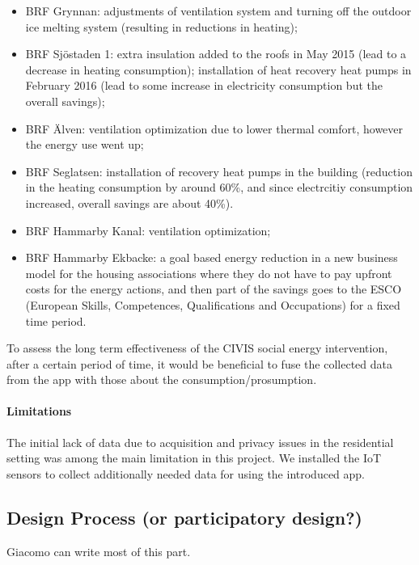 \begin{itemize}
	\setlength{\itemsep}{0mm}
	\item BRF	Grynnan: adjustments of	ventilation	system and	turning	off	the	outdoor	ice	melting	system (resulting in	reductions	in	heating);
	\item BRF	 Sj\"ostaden	 1: extra	 insulation	 added	 to	 the	 roofs in	May	2015	(lead	to	a	decrease	in	heating	consumption);	 installation	 of	 heat	 recovery	 heat	 pumps	 in	 February	 2016 (lead	 to	 some	 increase	 in	 electricity	 consumption	 but	 the	 overall	savings);
	\item BRF	\"Alven: ventilation	optimization due to lower thermal comfort,	however	the	energy	use	went	up;
	\item BRF	 Seglatsen: installation of recovery	heat	pumps	in	 the	building (reduction in	 the	heating	consumption	by	around	60\%, and since electrcitiy consumption increased, overall savings are	about	40\%).	
	\item BRF	 Hammarby	 Kanal:	 ventilation optimization;
	\item BRF	 Hammarby	 Ekbacke: a goal	 based	 energy	 reduction in	a	new	business	model	for	the	housing	associations	where	 they do not	 have	 to	 pay upfront	costs	for	the energy 	actions, and then part	of	the	savings	goes to	the	 ESCO (European Skills, Competences, Qualifications and Occupations)	 for	 a	 fixed	 time	 period.	
\end{itemize}


To assess the long term effectiveness of the CIVIS social energy intervention,  after a certain period of time, it would be beneficial to fuse the collected data from the app with those about the consumption/prosumption. 

\paragraph{Limitations} The initial lack of data due to acquisition and privacy issues in the residential setting was among the main limitation in this project. We installed the IoT sensors to collect additionally needed data for using the introduced app. 

\subsection{Design Process (or participatory design?)}

\begin{svgraybox}
[note by GP] Giacomo can write most of this part. 
\end{svgraybox}

